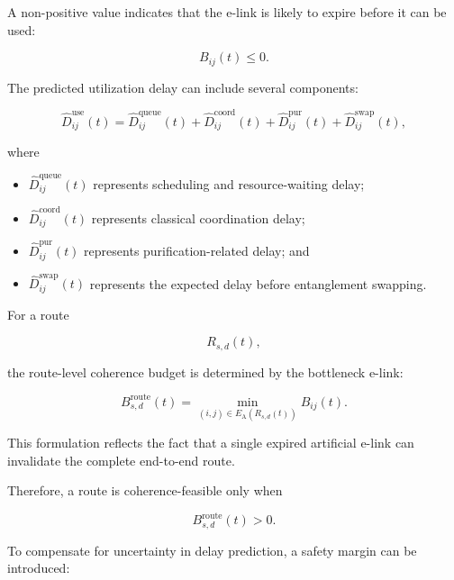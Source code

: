 A non-positive value indicates that the e-link is likely to expire before it can be used:

\begin{equation}
    B_{ij}(t)\leq 0.
\end{equation}

The predicted utilization delay can include several components:

\begin{equation}
    \widehat{D}_{ij}^{\mathrm{use}}(t)
    =
    \widehat{D}_{ij}^{\mathrm{queue}}(t)
    +
    \widehat{D}_{ij}^{\mathrm{coord}}(t)
    +
    \widehat{D}_{ij}^{\mathrm{pur}}(t)
    +
    \widehat{D}_{ij}^{\mathrm{swap}}(t),
\end{equation}

where

\begin{itemize}
    \item $\widehat{D}_{ij}^{\mathrm{queue}}(t)$ represents scheduling and resource-waiting delay;
    \item $\widehat{D}_{ij}^{\mathrm{coord}}(t)$ represents classical coordination delay;
    \item $\widehat{D}_{ij}^{\mathrm{pur}}(t)$ represents purification-related delay; and
    \item $\widehat{D}_{ij}^{\mathrm{swap}}(t)$ represents the expected delay before entanglement swapping.
\end{itemize}

For a route

\begin{equation}
    R_{s,d}(t),
\end{equation}

the route-level coherence budget is determined by the bottleneck e-link:

\begin{equation}
    B_{s,d}^{\mathrm{route}}(t)
    =
    \min_{
    (i,j)\in E_{\mathrm{A}}(R_{s,d}(t))
    }
    B_{ij}(t).
\end{equation}

This formulation reflects the fact that a single expired artificial e-link can invalidate the complete end-to-end route.

Therefore, a route is coherence-feasible only when

\begin{equation}
    B_{s,d}^{\mathrm{route}}(t)>0.
\end{equation}

To compensate for uncertainty in delay prediction, a safety margin can be introduced:


